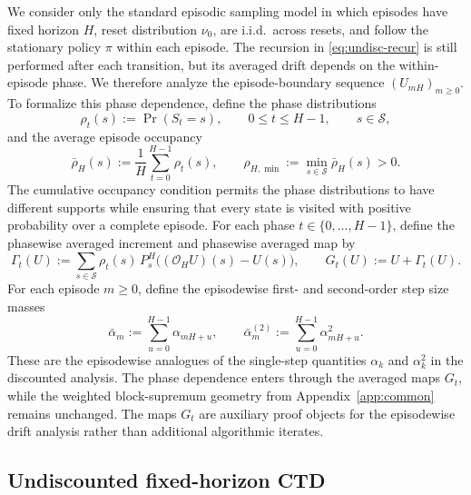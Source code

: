 \documentclass{article}
\newcommand{\X}{\mathcal{S}}
\begin{document}
We consider only the standard episodic sampling model in which episodes have fixed horizon $H$, reset distribution $\nu_0$, are i.i.d.\ across resets, and follow the stationary policy $\pi$ within each episode. The recursion in \eqref{eq:undisc-recur} is still performed after each transition, but its averaged drift depends on the within-episode phase. We therefore analyze the episode-boundary sequence $(U_{mH})_{m \ge 0}$. To formalize this phase dependence, define the phase distributions
\begin{equation}
\rho_t(s) := \Pr(S_t = s), \qquad 0 \le t \le H-1, \qquad s \in \X,
\end{equation}
and the average episode occupancy
\begin{equation}
\bar\rho_H(s):=\frac{1}{H}\sum_{t=0}^{H-1}\rho_t(s),\qquad \rho_{H,\min}:=\min_{s\in\X}\bar\rho_H(s)>0.
\end{equation}
The cumulative occupancy condition permits the phase distributions to have different supports while ensuring that every state is visited with positive probability over a complete episode. For each phase $t \in \{0,\ldots,H-1\}$, define the phasewise averaged increment and phasewise averaged map by
\begin{equation}
\Gamma_t(U) := \sum_{s \in \X} \rho_t(s)\, P_s^H \bigl((\mathcal O_H U)(s) - U(s) \bigr), \qquad G_t(U) := U + \Gamma_t(U).
\end{equation}
For each episode $m \ge 0$, define the episodewise first- and second-order step size masses
\begin{equation}
\bar\alpha_m := \sum_{u=0}^{H-1}\alpha_{mH+u}, \qquad \bar\alpha_m^{(2)} := \sum_{u=0}^{H-1}\alpha_{mH+u}^2.
\end{equation}
These are the episodewise analogues of the single-step quantities $\alpha_k$ and $\alpha_k^2$ in the discounted analysis. The phase dependence enters through the averaged maps $G_t$, while the weighted block-supremum geometry from Appendix~\ref{app:common} remains unchanged.
The maps $G_t$ are auxiliary proof objects for the episodewise drift analysis rather than additional algorithmic iterates.

\subsection{Undiscounted fixed-horizon CTD}
\end{document}

